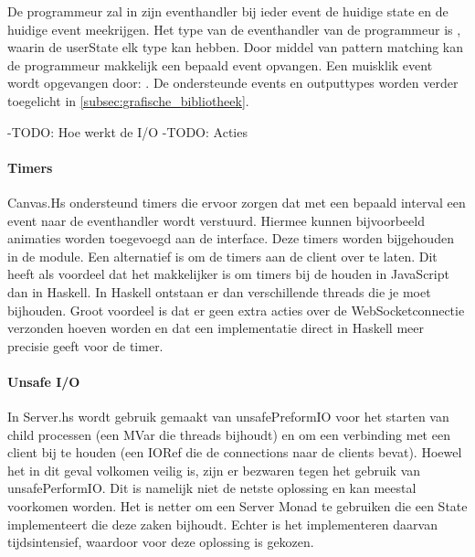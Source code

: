 De programmeur zal in zijn eventhandler bij ieder event de huidige state en de huidige event meekrijgen. Het type van de eventhandler van de programmeur is , waarin de userState elk type kan hebben. Door middel van pattern matching kan de programmeur makkelijk een bepaald event opvangen. Een muisklik event wordt opgevangen door: . De ondersteunde events en outputtypes worden verder toegelicht in \autoref{subsec:grafische_bibliotheek}.

-TODO: Hoe werkt de I/O  
-TODO: Acties   
\paragraph{Timers}
Canvas.Hs ondersteund timers die ervoor zorgen dat met een bepaald interval een event naar de eventhandler wordt verstuurd. Hiermee kunnen bijvoorbeeld animaties worden toegevoegd aan de interface. Deze timers worden bijgehouden in de module. Een alternatief is om de timers aan de client over te laten. Dit heeft als voordeel dat het makkelijker is om timers bij de houden in JavaScript dan in Haskell. In Haskell ontstaan er dan verschillende threads die je moet bijhouden. Groot voordeel is dat er geen extra acties over de WebSocketconnectie verzonden hoeven worden en dat een implementatie direct in Haskell meer precisie geeft voor de timer.

\paragraph{Unsafe I/O}
In Server.hs wordt gebruik gemaakt van unsafePreformIO voor het starten van child processen (een MVar die threads bijhoudt) en om een verbinding met een client bij te houden (een IORef die de connections naar de clients bevat). Hoewel het in dit geval volkomen veilig is, zijn er bezwaren tegen het gebruik van unsafePerformIO\cite{Haskell.org2008}. Dit is namelijk niet de netste oplossing en kan meestal voorkomen worden. Het is netter om een Server Monad te gebruiken die een State implementeert die deze zaken bijhoudt. Echter is het implementeren daarvan tijdsintensief, waardoor voor deze oplossing is gekozen.